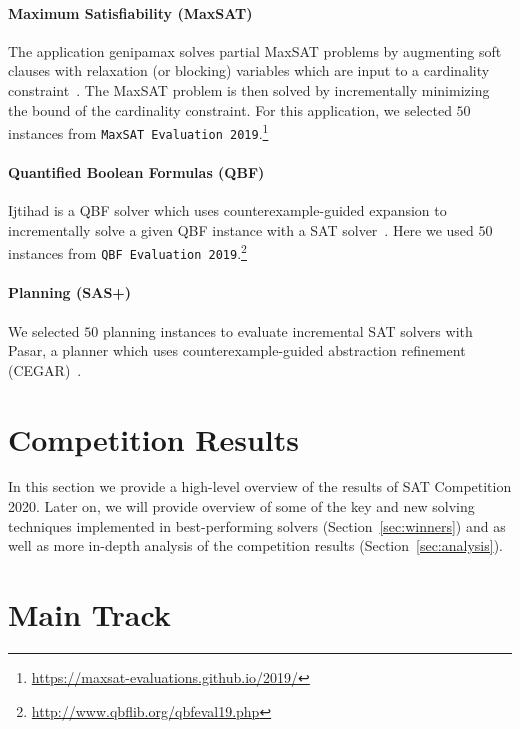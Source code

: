 \documentclass{elsarticle}
\begin{document}
\paragraph{Maximum Satisfiability (MaxSAT)}

The application \textsf{genipamax} solves partial MaxSAT problems by augmenting soft clauses with relaxation (or blocking) variables
which are input to a cardinality constraint~\cite{Philipp:2015:PBLib}. 
The MaxSAT problem is then solved by incrementally minimizing the bound of the cardinality constraint. 
For this application, we selected $50$ instances from \texttt{MaxSAT Evaluation 2019}.\footnote{\url{https://maxsat-evaluations.github.io/2019/}}

\paragraph{Quantified Boolean Formulas (QBF)}
\textsf{Ijtihad} is a QBF solver which uses counterexample-guided expansion to incrementally solve a given QBF instance with a SAT solver~\cite{Bloem:2018:QBFSAT}. 
Here we used $50$ instances from \texttt{QBF Evaluation 2019}.\footnote{\url{http://www.qbflib.org/qbfeval19.php}}

\paragraph{Planning (SAS+)}
We selected $50$ planning instances to evaluate incremental SAT solvers with \textsf{Pasar}, a planner which uses counterexample-guided abstraction refinement (CEGAR)~\cite{Froleyks:2019:Pasar}. 


\section{Competition Results}
\label{sec:results}

In this section we provide a high-level overview of the results of SAT Competition 2020.
Later on, we will provide overview of some of the key and new solving techniques implemented in best-performing solvers
(Section~\ref{sec:winners}) and as well as more in-depth analysis of the competition results (Section~\ref{sec:analysis}).

\section{Main Track}
\end{document}
